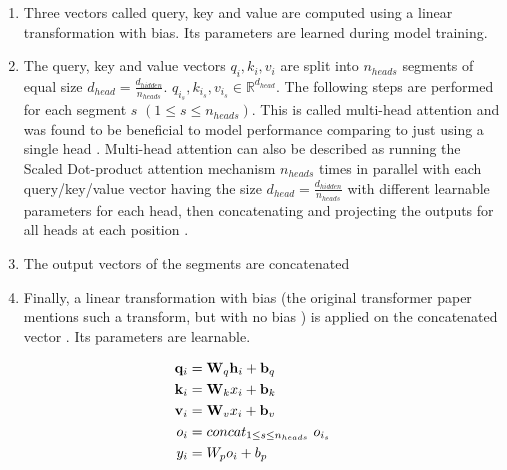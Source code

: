 \begin{enumerate}
\item Three vectors called query, key and value are computed using a linear transformation with bias. Its parameters are learned during model training.

\item The query, key and value vectors $q_i, k_i, v_i$ are split into $n_{heads}$ segments of equal size $d_{head} = \frac{d_{hidden}}{n_{heads}}$. $q_{i_s}, k_{i_s}, v_{i_s} \in \mathbb{R}^{d_{head}}$. The following steps are performed for each segment $s$ $(1 \leq s \leq n_{heads})$. This is called multi-head attention and was found to be beneficial to model performance comparing to just using a single head  \cite{alammar-gpt2}.
Multi-head attention can also be described as running the Scaled Dot-product attention mechanism $n_{heads}$ times in parallel with each query/key/value vector having the size $d_{head} = \frac{d_{hidden}}{n_{heads}}$ with different learnable parameters for each head, then concatenating and projecting the outputs for all heads at each position .

\item The output vectors of the segments are concatenated

\item Finally, a linear transformation with bias (the original transformer paper mentions such a transform, but with no bias ) is applied on the concatenated vector \cite{alammar-gpt2}. Its parameters are learnable.
\end{enumerate}


\begin{align}
	\mathbf{q}_i &= \mathbf{W}_q {\mathbf{h}}_i + \mathbf{b}_q \\
	\mathbf{k}_i &= \mathbf{W}_k x_i + \mathbf{b}_k \\
	\mathbf{v}_i &= \mathbf{W}_v x_i + \mathbf{b}_v \\
	o_i &= concat _{1 \leq s \leq n_{heads}} \ o_{i_s} \\
	y_i &= W_p o_i + b_p
\end{align}




